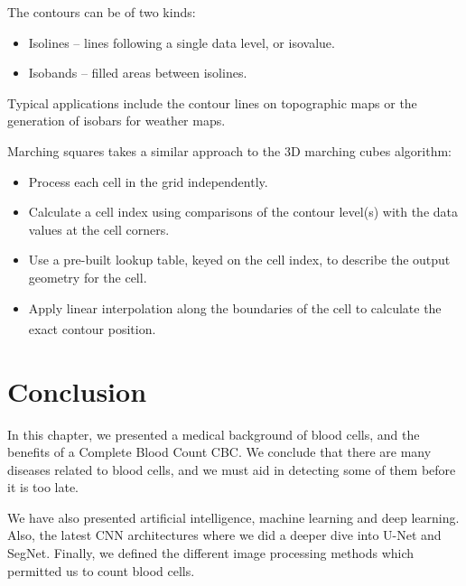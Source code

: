 The contours can be of two kinds:

\begin{itemize}
    \item Isolines – lines following a single data level, or isovalue.
    \item Isobands – filled areas between isolines.
\end{itemize}

Typical applications include the contour lines on topographic maps or the generation of isobars for weather maps.

Marching squares takes a similar approach to the 3D marching cubes algorithm:

\begin{itemize}
    \item Process each cell in the grid independently.
    \item Calculate a cell index using comparisons of the contour level(s) with the data values at the cell corners.
    \item Use a pre-built lookup table, keyed on the cell index, to describe the output geometry for the cell.
    \item Apply linear interpolation along the boundaries of the cell to calculate the exact contour position. \textsuperscript{\cite{maple2003geometric}}
\end{itemize}


\section{Conclusion}
\hspace{\parindent}
In this chapter, we presented a medical background of blood cells, and the benefits of a Complete Blood Count CBC.
We conclude that there are many diseases related to blood cells, and we must aid in detecting some of them before it is too late.

We have also presented artificial intelligence, machine learning and deep learning. Also, the latest CNN architectures where we did a deeper dive into U-Net and SegNet.
Finally, we defined the different image processing methods which permitted us to count blood cells.
